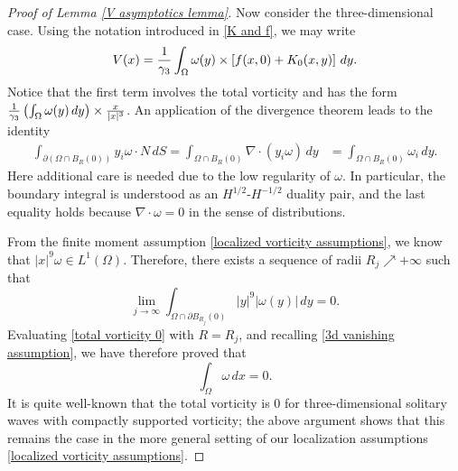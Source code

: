 \documentclass[11pt,reqno]{amsart}
\theoremstyle{plain}
\theoremstyle{remark}
\numberwithin{equation}{section}
\begin{document}
\begin{proof}[Proof of Lemma \ref{V asymptotics lemma}]
Now consider the three-dimensional case.  Using the notation introduced in \eqref{K and f}, we may write
\begin{equation}
  \label{3d V}
  V(x) = {1\over \gamma_3} \int_\Omega \omega(y) \times \left[ f(x, 0) + K_0(x, y) \right]\, dy. 
\end{equation}
Notice that the first term involves the total vorticity and has the form ${1\over \gamma_3} \left( \int_\Omega \omega(y)\, dy \right) \times {x\over |x|^3}$.
An application of the divergence theorem leads to the identity
\begin{align}
\int_{\partial (\Omega \cap B_R(0))} y_i \omega \cdot N \, dS = \int_{\Omega \cap B_R(0)} \nabla \cdot (y_i \omega)\, dy & =  \int_{\Omega \cap B_R(0)} \omega_i \, dy. \label{total vorticity 0}
\end{align}
Here additional care is needed due to the low regularity of $\omega$. In particular, the boundary integral is understood as an $H^{1/2}$-$H^{-1/2}$ duality pair, and the last equality holds because $\nabla \cdot \omega = 0$ in the sense of distributions.

From the finite moment assumption \eqref{localized vorticity assumptions}, we know that
$|x|^9\omega \in L^1(\Omega)$. 
Therefore, there exists a sequence of radii $R_j \nearrow +\infty$ such that 
$$\lim_{j\to \infty} \int_{\Omega \cap \partial B_{R_j}(0)} |y|^9 |\omega(y)| \, dy = 0.$$ 
Evaluating \eqref{total vorticity 0} with $R = R_j$, and recalling \eqref{3d vanishing assumption}, we have therefore proved that
\begin{equation}
  \label{net vorticity zero}
  \int_\Omega \omega \, dx = 0. 
\end{equation}
It is quite well-known that the total vorticity is $0$ for three-dimensional solitary waves with compactly supported vorticity; the above argument shows that this remains the case in the more general setting of our localization assumptions \eqref{localized vorticity assumptions}.  


\end{proof}
\end{document}

